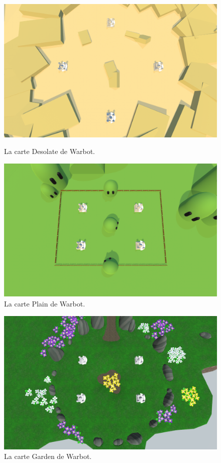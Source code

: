 \documentclass{report}
\begin{document}
\begin{figure}[h]
    \begin{minipage}[c]{.46\linewidth}
        \centering
	\includegraphics[scale=0.25]{MapDesolateImage}
	\caption{La carte Desolate de Warbot.}
    \end{minipage}
    \hfill%
    \begin{minipage}[c]{.46\linewidth}
        \centering
	\includegraphics[scale=0.25]{MapPlainImage}
	\caption{La carte Plain de Warbot.}
    \end{minipage}
\end{figure}
\begin{figure}[!h]
        \centering
		\includegraphics[scale=0.25]{MapGardenImage}
	\caption{La carte Garden de Warbot.}
\end{figure}
\newpage
\newpage
\newpage
\newpage
\end{document}
